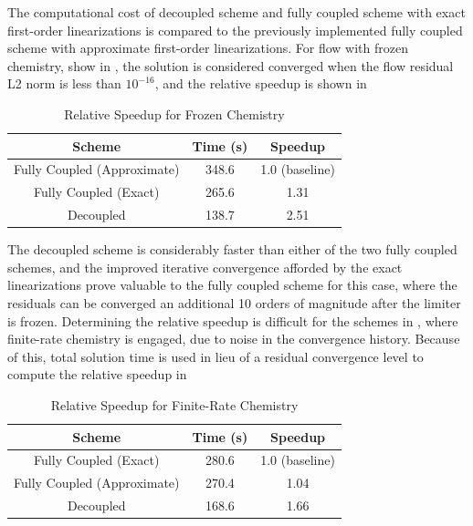 The computational cost of decoupled scheme and fully coupled scheme with exact
first-order linearizations is compared to the previously implemented fully coupled
scheme with approximate first-order linearizations.
For flow with frozen chemistry, show in ,
the solution is considered converged when the flow residual L2 norm is less
than $10^{-16}$, and the relative speedup is shown in
\begin{table}[h]
  \centering
  \begin{tabular}{c|c|c}
    Scheme & Time (s) & Speedup \\
    \hline
    Fully Coupled (Approximate) & 348.6 & 1.0 (baseline) \\
    Fully Coupled (Exact)       & 265.6 & 1.31 \\
    Decoupled                   & 138.7 & 2.51
  \end{tabular}
  \caption{Relative Speedup for Frozen Chemistry}
  \label{tab:srp-rel-speedup-frozen}
\end{table}
The decoupled scheme is considerably faster than either of the two fully coupled
schemes, and the improved iterative convergence afforded by the exact
linearizations prove valuable to the fully coupled scheme for this case, where
the residuals can be converged an additional 10 orders of magnitude after the
limiter is frozen.  Determining the relative speedup is difficult for the
schemes in , where finite-rate chemistry is
engaged, due to noise in the convergence history.  Because of this, total
solution time is used in lieu of a residual convergence level to compute the
relative speedup in 
\begin{table}[h]
  \centering
  \begin{tabular}{c|c|c}
    Scheme & Time (s) & Speedup \\
    \hline
    Fully Coupled (Exact)       & 280.6 & 1.0 (baseline) \\
    Fully Coupled (Approximate) & 270.4 & 1.04 \\
    Decoupled                   & 168.6 & 1.66
  \end{tabular}
  \caption{Relative Speedup for Finite-Rate Chemistry}
  \label{tab:srp-rel-speedup-chem}
\end{table}
